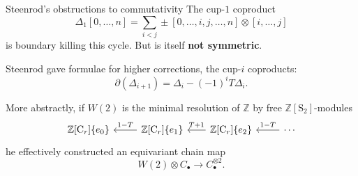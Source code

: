 \documentclass[10pt,t]{beamer}
\renewcommand{\S}{\mathrm{S}}
\newcommand{\C}{\mathrm{C}}
\begin{document}
\begin{frame}[fragile]{Steenrod's obstructions to commutativity}
	The cup-$1$ coproduct
	\begin{equation*}
	\Delta_1 [0, \dots, n] = \sum_{i<j} \pm [0, \dots, i, j, \dots, n] \otimes [i, \dots, j]
	\end{equation*}
	is boundary killing this cycle. But is itself \textbf{not symmetric}.
	
	\vspace*{10pt} \pause
	
	Steenrod gave formulae for higher corrections, the cup-$i$ coproducts:
	\begin{equation*}
	\partial (\Delta_{i+1}) = \Delta_i - (-1)^i T \Delta_i.
	\end{equation*}
	
	\vspace*{0pt}\pause
	
	More abstractly, if $W(2)$ is the minimal resolution of $\mathbb Z$ by free $\mathbb Z[\S_2]$-modules
	\begin{equation*}
	\begin{tikzcd}[column sep=normal]
	\mathbb{Z}[\C_r]\{e_0\} & \arrow[l, "1-T"'] \mathbb{Z}[\C_r]\{e_1\} &[-5pt] \arrow[l, "T+1"']
	\mathbb{Z}[\C_r]\{e_2\} & \arrow[l, "1-T"'] \cdots
	\end{tikzcd}
	\end{equation*}
	\pause he effectively constructed an equivariant chain map
	\begin{equation*}
	W(2) \otimes C_\bullet \to C_\bullet^{\otimes 2}.
	\end{equation*}
\end{frame}
	
\end{document}
